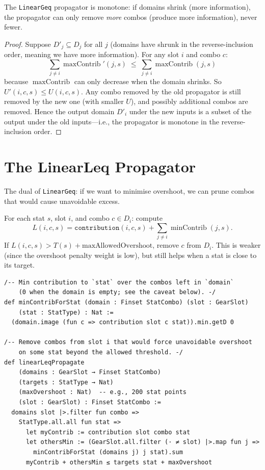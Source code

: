 \documentclass[11pt, a4paper, oneside]{book}
\newcommand{\maxContrib}{\operatorname{maxContrib}}
\newcommand{\minContrib}{\operatorname{minContrib}}
\begin{document}
\begin{propbox}[title={Monotonicity of LinearGeq}]
The \texttt{LinearGeq} propagator is monotone: if domains shrink
(more information), the propagator can only remove \emph{more} combos
(produce more information), never fewer.
\end{propbox}

\begin{proof}
Suppose $D'_j \subseteq D_j$ for all $j$ (domains have shrunk in the
reverse-inclusion order, meaning we have more information).  For any slot $i$
and combo $c$:
\[
  \sum_{j \neq i} \maxContrib'(j, s)
  \;\leq\;
  \sum_{j \neq i} \maxContrib(j, s)
\]
because $\maxContrib$ can only decrease when the domain shrinks.  So $U'(i,c,s)
\leq U(i,c,s)$.  Any combo removed by the old propagator is still removed by the
new one (with smaller $U$), and possibly additional combos are removed.  Hence
the output domain $D'_i$ under the new inputs is a subset of the output
under the old inputs---i.e., the propagator is monotone in the reverse-inclusion
order.
\end{proof}

\section{The LinearLeq Propagator}

The dual of \texttt{LinearGeq}: if we want to minimise overshoot, we can
prune combos that would cause unavoidable excess.

\begin{defbox}[title={LinearLeq Propagator}]
For each stat $s$, slot $i$, and combo $c \in D_i$: compute
\[
  L(i, c, s) = \texttt{contribution}(i, c, s) + \sum_{j \neq i} \minContrib(j, s).
\]
If $L(i, c, s) > T(s) + \text{maxAllowedOvershoot}$, remove $c$ from $D_i$.
This is weaker (since the overshoot penalty weight is low), but still helps
when a stat is close to its target.
\end{defbox}

\begin{leanbox}[title={Lean 4 (Mathlib) --- LinearLeq Propagator}]
\begin{verbatim}
/-- Min contribution to `stat` over the combos left in `domain`
    (0 when the domain is empty; see the caveat below). -/
def minContribForStat (domain : Finset StatCombo) (slot : GearSlot)
    (stat : StatType) : Nat :=
  (domain.image (fun c => contribution slot c stat)).min.getD 0

/-- Remove combos from slot i that would force unavoidable overshoot
    on some stat beyond the allowed threshold. -/
def linearLeqPropagate
    (domains : GearSlot → Finset StatCombo)
    (targets : StatType → Nat)
    (maxOvershoot : Nat)  -- e.g., 200 stat points
    (slot : GearSlot) : Finset StatCombo :=
  domains slot |>.filter fun combo =>
    StatType.all.all fun stat =>
      let myContrib := contribution slot combo stat
      let othersMin := (GearSlot.all.filter (· ≠ slot) |>.map fun j =>
        minContribForStat (domains j) j stat).sum
      myContrib + othersMin ≤ targets stat + maxOvershoot
\end{verbatim}
\end{leanbox}
\end{document}
